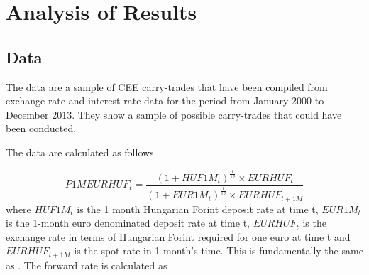 \documentclass[12pt, a4paper, oneside]{article} %
\begin{document}




\section{Analysis of Results}
\subsection{Data}
The data are a sample of CEE carry-trades that have been compiled from exchange rate and interest rate data for the period from January 2000 to December 2013.  They show a sample of possible carry-trades that could have been conducted. 

The data are calculated as follows

\begin{equation}\label{eqref:carryprofit}
P1MEURHUF_t = \frac{(1 + HUF1M_t)^{\frac{1}{12}} \times EURHUF_t }{(1 + EUR1M_t)^{\frac{1}{12}} \times EURHUF_{t+1M}}
\end{equation}
where $HUF1M_t$ is the 1 month Hungarian Forint deposit rate at time t, $EUR1M_t$ is the 1-month euro denominated deposit rate at time t, $EURHUF_t$ is the exchange rate in terms of  Hungarian Forint required for one euro at time t and  $EURHUF_{t+1M}$ is the spot rate in 1 month's time.  This is fundamentally the same as \citep{BrunnermeierCarry}. The forward rate is calculated as
\end{document}
